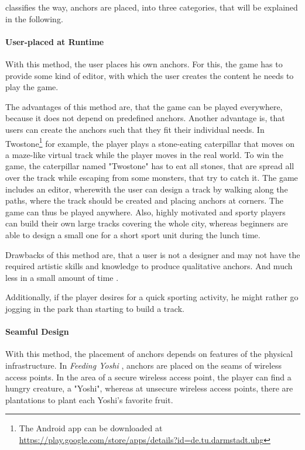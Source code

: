 \citeauthor{reid2008design} classifies the way, anchors are placed, into three categories, that will be explained in the following.

\paragraph{User-placed at Runtime}
With this method, the user places his own anchors. For this, the game has to provide some kind of editor, with which the user creates the content he needs to play the game.

The advantages of this method are, that the game can be played everywhere, because it does not depend on predefined anchors. Another advantage is, that users can create the anchors such that they fit their individual needs. In Twostone\footnote{The Android app can be downloaded at \url{https://play.google.com/store/apps/details?id=de.tu.darmstadt.uhg}} for example, the player plays a stone-eating caterpillar that moves on a maze-like virtual track while the player moves in the real world. To win the game, the caterpillar named "Twostone" has to eat all stones, that are spread all over the track while escaping from some monsters, that try to catch it. The game includes an editor, wherewith the user can design a track by walking along the paths, where the track should be created and placing anchors at corners. The game can thus be played anywhere. Also, highly motivated and sporty players can build their own large tracks covering the whole city, whereas beginners are able to design a small one for a short sport unit during the lunch time.

Drawbacks of this method are, that a user is not a designer and may not have the required artistic skills and knowledge to produce qualitative anchors. And much less in a small amount of time \citep{carraca2014procedural}.

Additionally, if the player desires for a quick sporting activity, he might rather go jogging in the park than starting to build a track.

\paragraph{Seamful Design}
With this method, the placement of anchors depends on features of the physical infrastructure. In \emph{Feeding Yoshi} \citep{reid2008design}, anchors are placed on the seams of wireless access points. In the area of a secure wireless access point, the player can find a hungry creature, a "Yoshi", whereas at unsecure wireless access points, there are plantations to plant each Yoshi's favorite fruit.

